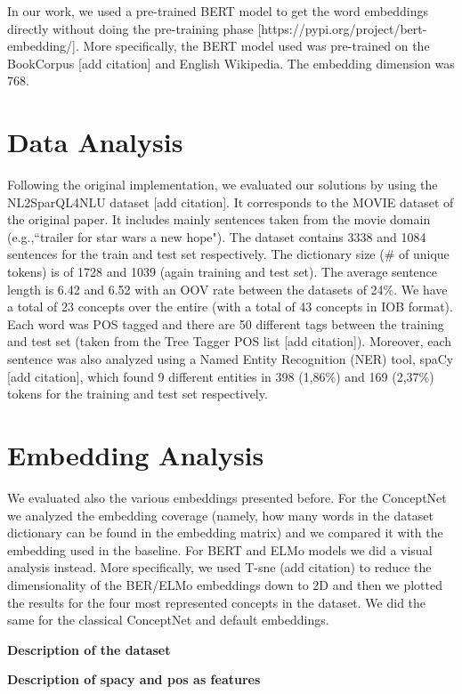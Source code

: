\documentclass[11pt,a4paper]{article}
\begin{document}
In our work, we used a pre-trained BERT model to get the word embeddings directly without doing the pre-training phase [https://pypi.org/project/bert-embedding/]. More specifically, the BERT model used was pre-trained on the BookCorpus [add citation] and English Wikipedia. The embedding dimension was 768. 



\section{Data Analysis}

Following the original implementation, we evaluated our solutions by using the NL2SparQL4NLU dataset [add citation]. It corresponds to the MOVIE dataset of the original paper. It includes mainly sentences taken from the movie domain (e.g.,``trailer for star wars a new hope"). The dataset contains 3338 and 1084 sentences for the train and test set respectively. The dictionary size (\# of unique tokens) is of 1728 and 1039  (again training and test set). The average sentence length is 6.42 and 6.52 with an OOV rate between the datasets of 24\%. We have a total of 23 concepts over the entire (with a total of 43 concepts in IOB format). Each word was POS tagged and there are 50 different tags between the training and test set (taken from the Tree Tagger POS list [add citation]). Moreover, each sentence was also analyzed using a Named Entity Recognition (NER) tool, spaCy [add citation], which found 9 different entities in 398 (1,86\%)  and 169 (2,37\%) tokens for the training and test set respectively.

\section{Embedding Analysis}
We evaluated also the various embeddings presented before. For the ConceptNet we analyzed the embedding coverage (namely, how many words in the dataset dictionary can be found in the embedding matrix) and we compared it with the embedding used in the baseline. For BERT and ELMo models we did a visual analysis instead. More specifically, we used T-sne (add citation) to reduce the dimensionality of the BER/ELMo embeddings down to 2D and then we plotted the results for the four most represented concepts in the dataset. We did the same for the classical ConceptNet and default embeddings.

\textbf{Description of the dataset}

\textbf{Description of spacy and pos as features}
\end{document}
